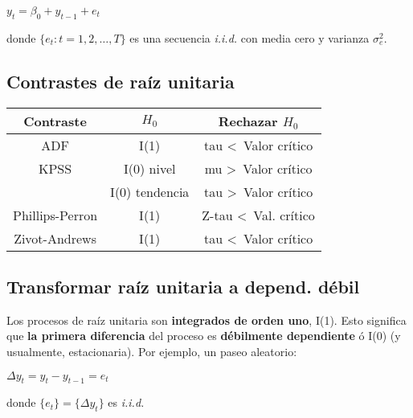 \documentclass[10pt, a4paper, landscape]{article}
\begin{document}
\begin{multicols}{3}
\begin{itemize}[leftmargin=*]
			\begin{center}
				$y_{t} = \beta_{0} + y_{t - 1} + e_{t}$
			\end{center}
			
			donde $\lbrace e_{t} : t = 1, 2, \ldots, T \rbrace$ es una secuencia \textsl{i.i.d.} con media cero y varianza $\sigma^{2}_{e}$.
		\end{itemize}
		
		\subsection*{Contrastes de raíz unitaria}
		
		\begin{center}
			\begin{tabular}{ c | c | c }
				Contraste       & $H_{0}$        & Rechazar $H_{0}$                  \\ \hline
				ADF             & I(1)           & tau \textless \, Valor crítico    \\ \hline
				KPSS            & I(0) nivel     & mu \textgreater \, Valor crítico  \\
				                & I(0) tendencia & tau \textgreater \, Valor crítico \\ \hline
				Phillips-Perron & I(1)           & Z-tau \textless \, Val. crítico   \\ \hline
				Zivot-Andrews   & I(1)           & tau \textless \, Valor crítico
			\end{tabular}
		\end{center}
		
		\subsection*{Transformar raíz unitaria a depend. débil}
		
		Los procesos de raíz unitaria son \textbf{integrados de orden uno}, I(1). Esto significa que \textbf{la primera diferencia} del proceso es \textbf{débilmente dependiente} ó I(0) (y usualmente, estacionaria). Por ejemplo, un paseo aleatorio:
		
		\begin{multicols}{2}
			\begin{center}
				$\Delta y_{t} = y_{t} - y_{t - 1} = e_{t}$
			\end{center}
			
			donde $\lbrace e_{t} \rbrace = \lbrace \Delta y_{t} \rbrace$ es \textsl{i.i.d.} \\
			

\end{multicols}
\end{multicols}
\end{document}
